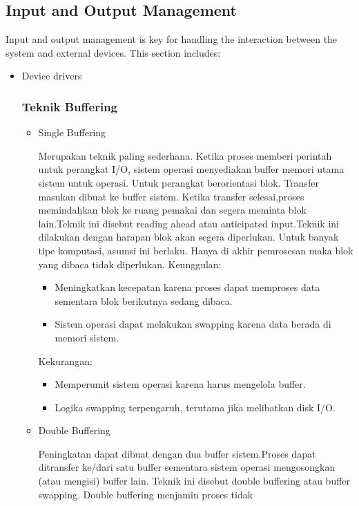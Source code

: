 \documentclass[12pt]{article}
\begin{document}
\subsection{Input and Output Management}
Input and output management is key for handling the interaction between the system and external devices. This section includes:
\begin{itemize}
    \item Device drivers
    \subsubsection{Teknik Buffering}
    \begin{itemize}
        \item Single Buffering
        \par Merupakan teknik paling sederhana. Ketika proses memberi perintah untuk perangkat
 I/O, sistem operasi menyediakan buffer memori utama sistem untuk operasi. Untuk
 perangkat berorientasi blok. Transfer masukan dibuat ke buffer sistem. Ketika transfer
 selesai,proses memindahkan blok ke ruang pemakai dan segera meminta blok lain.Teknik
 ini disebut reading ahead atau anticipated input.Teknik ini dilakukan dengan harapan
 blok akan segera diperlukan. Untuk banyak tipe komputasi, asumsi ini berlaku. Hanya
 di akhir pemrosesan maka blok yang dibaca tidak diperlukan.
 \newline Keunggulan:
    \begin{itemize}
        \item  Meningkatkan kecepatan karena proses
 dapat memproses data sementara blok
 berikutnya sedang dibaca.
 \item Sistem operasi dapat melakukan swapping
 karena data berada di memori sistem.
    \end{itemize}
    \newline Kekurangan:
    \begin{itemize}
        \item Memperumit sistem operasi karena harus
        mengelola buffer.
        \item Logika swapping terpengaruh, terutama jika
        melibatkan disk I/O.
    \end{itemize}
    \item Double Buffering
    \par Peningkatan dapat dibuat dengan dua buffer sistem.Proses dapat ditransfer ke/dari satu
    buffer sementara sistem operasi mengosongkan (atau mengisi) buffer lain. Teknik ini
    disebut double buffering atau buffer swapping. Double buffering menjamin proses tidak

\end{itemize}
\end{itemize}
\end{document}

